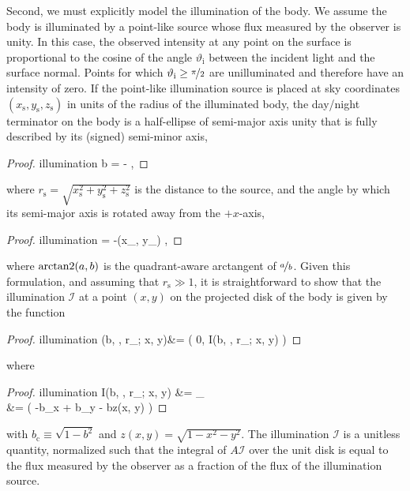 \documentclass[modern]{aastex62}
\begin{document}
Second, we must explicitly model the illumination of the body. We assume the
body is illuminated by a point-like source whose flux measured by the observer
is unity. In this case, the observed intensity at any
point on the surface is proportional to the cosine of the angle $\vartheta_\mathrm{i}$ between
the incident light and the surface normal. Points for which
$\vartheta_\mathrm{i} \ge \nicefrac{\pi}{2}$ are unilluminated and
therefore have an intensity of zero.
%
If the point-like illumination source is placed at sky coordinates
$(x_\mathrm{s}, y_\mathrm{s}, z_\mathrm{s})$ in units of the radius of the illuminated body,
the day/night terminator on the body is a half-ellipse
of semi-major axis unity that is fully described by its (signed) semi-minor
axis,
%
\begin{proof}{illumination}
    \label{eq:b}
    b = -
    \quad,
\end{proof}
%
where $r_\mathrm{s} = \sqrt{x_\mathrm{s}^2 + y_\mathrm{s}^2 + z_\mathrm{s}^2}$ is the distance to the source,
%
and the angle by which its semi-major axis is rotated away from the
$+x$-axis,
%
\begin{proof}{illumination}
    \label{eq:theta}
    \theta = -\atantwo(x_, y_)
    \quad,
\end{proof}
%
where ${\text{arctan2}}(a, b)$ is the quadrant-aware arctangent of
$\nicefrac{a}{b}$.
Given this formulation, and assuming that
$r_\mathrm{s} \gg 1$,
it is straightforward to show that the illumination
$\mathcal{I}$ at a point $(x, y)$ on the projected disk of the body is given
by the function
%
\begin{proof}{illumination}
    \label{eq:illum}
    (b, \theta, r_; x, y)&=
    \bigg( 0, I(b, \theta, r_; x, y) \bigg)
\end{proof}
%
where
%
\begin{proof}{illumination}
    \label{eq:illum_poly}
    I(b, \theta, r_; x, y) &=
    \cos \vartheta_
    \nonumber \\
    &= 
    \bigg(
    -b_\sin\theta x + b_\cos\theta y - bz(x, y)
    \bigg)
\end{proof}
%
with $b_\mathrm{c} \equiv \sqrt{1 - b^2}$ and $z(x, y) = \sqrt{1 - x^2 - y^2}$.
The illumination $\mathcal{I}$ is a unitless quantity, normalized such that
the integral of $A\mathcal{I}$ over the unit
disk is equal to the flux measured
by the observer as a fraction of the flux of the illumination source.
\end{document}
